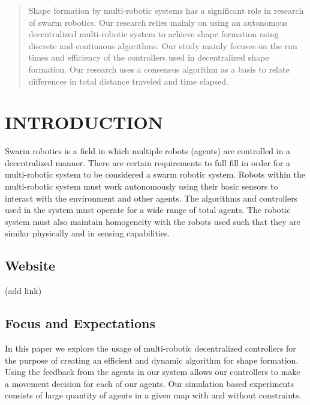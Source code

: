 \usepackage{amsmath}
\usepackage{unicode-math}
\usepackage{tabto}
\usepackage{graphicx}
\usepackage{float}
\usepackage[section]{placeins}
\usepackage{subfig}





\maketitle
\thispagestyle{empty}
\pagestyle{empty}


\begin{abstract}

Shape formation by multi-robotic systems has a significant role in research of swarm robotics. Our research relies mainly on using an autonomous decentralized multi-robotic system to achieve shape formation using discrete and continuous algorithms. Our study mainly focuses on the run times and efficiency of the controllers used in decentralized shape formation. Our research uses a consensus algorithm as a basis to relate differences in total distance traveled and time elapsed.

\end{abstract}


\section{INTRODUCTION}

Swarm robotics is a field in which multiple robots (agents) are controlled in a decentralized manner. There are certain requirements to full fill in order for a multi-robotic system to be considered a swarm robotic system. Robots within the multi-robotic system must work autonomously using their basic sensors to interact with the environment and other agents. The algorithms and controllers used in the system must operate for a wide range of total agents. The robotic system must also maintain homogeneity with the robots used such that they are similar physically and in sensing capabilities. 
\subsection{Website}
(add link) 
\subsection{Focus and Expectations}
In this paper we explore the usage of  multi-robotic decentralized controllers for the purpose of creating an efficient and dynamic algorithm for shape formation. Using the feedback from the agents in our system allows our controllers to make a movement decision for each of our agents. Our simulation based experiments consists of large quantity of agents in a given map with and without constraints. 


